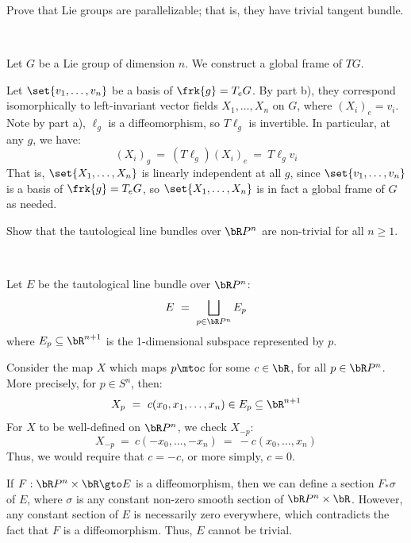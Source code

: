 \documentclass[14pt]{extarticle}
\begin{document}
\begin{qu}[num=6.16 extra]
	Prove that Lie groups are parallelizable;
	that is, they have trivial tangent bundle.
\end{qu} \

\begin{soln}
	Let $G$ be a Lie group of dimension $n$.
	We construct a global frame of $TG$.

	Let $\set{v_{1},\dots,v_{n}}$ be a basis of $\frk{g}=T_{e}G$.
	By part b), they correspond isomorphically to left-invariant vector
	fields $X_{1},\dots,X_{n}$ on $G$, where $(X_{i})_{e} = v_{i}$.
	Note by part a), $\ell_{g}$ is a diffeomorphism, so $T\ell_{g}$ is invertible.
	In particular, at any $g$, we have:
	\begin{equation*}
		(X_{i})_{g} \ = \ (T\ell_{g})(X_{i})_{e} \ = \ T\ell_{g}v_{i}
	\end{equation*}
	That is, $\set{X_{1},\dots,X_{n}}$ is linearly independent at all $g$,
	since $\set{v_{1},\dots,v_{n}}$ is a basis of $\frk{g}=T_{e}G$, so
	$\set{X_{1},\dots,X_{n}}$ is in fact a global frame of $G$ as needed.
\end{soln}


\nq
\begin{qu}[num=9.2]
	Show that the tautological line bundles over $\bR P^{n}$ are
	non-trivial for all $n\geq1$.
\end{qu} \

\begin{soln}
	Let $E$ be the tautological line bundle over $\bR P^{n}$:
	\begin{equation*}
		E \ = \ \bigsqcup_{p\in\bR P^{n}}E_{p}
	\end{equation*}
	where $E_{p}\subseteq\bR^{n+1}$ is the 1-dimensional subspace represented by $p$.
	
	Consider the map $X$ which maps $p\mto c$ for some $c\in\bR$, for all $p\in\bR P^{n}$.
	More precisely, for $p\in S^{n}$, then:
	\begin{equation*}
		X_{p} \ = \ c(x_{0},x_{1},\dots,x_{n}) \in E_{p} \subseteq \bR^{n+1}
	\end{equation*}
	For $X$ to be well-defined on $\bR P^{n}$, we check $X_{-p}$:
	\begin{equation*}
		X_{-p} \ = \ c(-x_{0},\dots,-x_{n}) \ = \ -c(x_{0},\dots,x_{n})
	\end{equation*}
	Thus, we would require that $c=-c$, or more simply, $c=0$.

	If $F:\bR P^{n}\times\bR\gto E$ is a diffeomorphism, then we can define
	a section $F_{*}\sigma$ of $E$, where $\sigma$ is any constant non-zero smooth section of
	$\bR P^{n}\times\bR$.
	However, any constant section of $E$ is necessarily zero everywhere, which
	contradicts the fact that $F$ is a diffeomorphism.
	Thus, $E$ cannot be trivial.
\end{soln}
\end{document}
